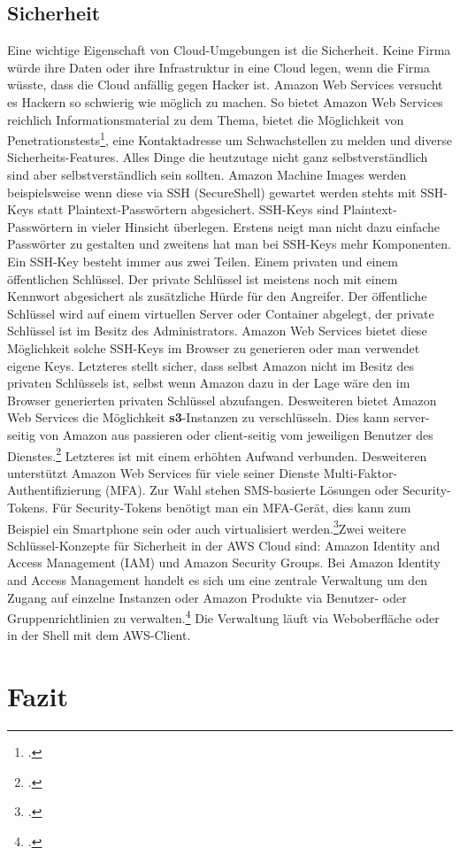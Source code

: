 \documentclass[titlepage]{report}
\begin{document}
\section*{Sicherheit}
Eine wichtige Eigenschaft von Cloud\hyp{}Umgebungen ist die Sicherheit.
Keine Firma würde ihre Daten oder ihre Infrastruktur in eine Cloud
legen, wenn die Firma wüsste, dass die Cloud anfällig gegen Hacker ist.
Amazon Web Services versucht es Hackern so schwierig wie möglich zu
machen. So bietet Amazon Web Services reichlich Informationsmaterial zu
dem Thema, bietet die Möglichkeit von
Penetrationstests\footcite{penetration}, eine
Kontaktadresse um Schwachstellen zu melden und diverse
Sicherheits\hyp{}Features. Alles Dinge die heutzutage nicht ganz
selbstverständlich sind aber selbstverständlich sein sollten.
Amazon Machine Images werden beispielsweise wenn diese via SSH
(SecureShell) gewartet werden stehts mit SSH\hyp{}Keys statt
Plaintext\hyp{}Passwörtern abgesichert. SSH\hyp{}Keys sind
Plaintext\hyp{}Passwörtern in vieler Hinsicht überlegen. Erstens neigt
man nicht dazu einfache Passwörter zu gestalten und zweitens hat man bei
SSH\hyp{}Keys mehr Komponenten. Ein SSH\hyp{}Key besteht immer aus zwei
Teilen. Einem privaten und einem öffentlichen Schlüssel. Der private
Schlüssel ist meistens noch mit einem Kennwort abgesichert als
zusätzliche Hürde für den Angreifer. Der öffentliche Schlüssel wird auf
einem virtuellen Server oder Container abgelegt, der private Schlüssel
ist im Besitz des Administrators. Amazon Web Services bietet diese
Möglichkeit solche SSH\hyp{}Keys im Browser zu generieren oder man
verwendet eigene Keys. Letzteres stellt sicher, dass selbst Amazon nicht
im Besitz des privaten Schlüssels ist, selbst wenn Amazon dazu in der
Lage wäre den im Browser generierten privaten Schlüssel abzufangen.
Desweiteren bietet Amazon Web Services die Möglichkeit
\textbf{s3}\hyp{}Instanzen zu verschlüsseln. Dies kann
server\hyp{}seitig von Amazon aus passieren oder client\hyp{}seitig vom
jeweiligen Benutzer des Dienstes.\footcite{encryption} Letzteres ist mit
einem erhöhten Aufwand verbunden. Desweiteren unterstützt Amazon Web
Services für viele seiner Dienste
Multi\hyp{}Faktor\hyp{}Authentifizierung (MFA). Zur Wahl stehen
SMS\hyp{}basierte Lösungen oder Security\hyp{}Tokens. Für
Security\hyp{}Tokens benötigt man ein MFA\hyp{}Gerät, dies kann zum
Beispiel ein Smartphone sein oder auch virtualisiert
werden.\footcite{mfa}Zwei weitere Schlüssel\hyp{}Konzepte für Sicherheit
in der AWS Cloud sind: Amazon Identity and Access Management (IAM) und
Amazon Security Groups. Bei Amazon Identity and Access Management
handelt es sich um eine zentrale Verwaltung um den Zugang auf einzelne
Instanzen oder Amazon Produkte via Benutzer\hyp{} oder
Gruppenrichtlinien zu verwalten.\footcite{iam} Die Verwaltung läuft via Weboberfläche
oder in der Shell mit dem AWS\hyp{}Client.
\chapter*{Fazit}
\nocite{*}
\printbibliography
\listoffigures
\end{document}
